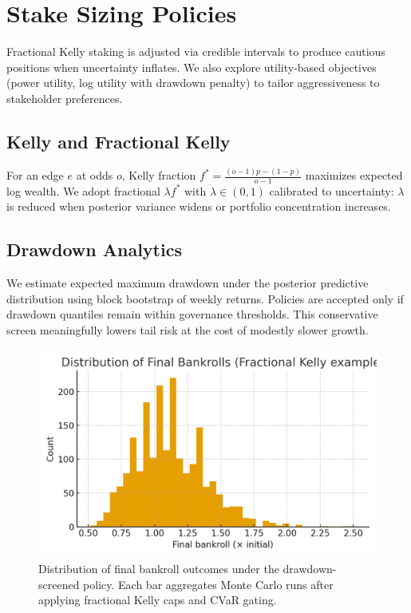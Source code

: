 \section{Stake Sizing Policies}
Fractional Kelly staking is adjusted via credible intervals to produce cautious positions when uncertainty inflates. We also explore utility-based objectives (power utility, log utility with drawdown penalty) to tailor aggressiveness to stakeholder preferences.

\subsection{Kelly and Fractional Kelly}
For an edge \(e\) at odds \(o\), Kelly fraction \(f^* = \frac{(o-1)p - (1-p)}{o-1}\) maximizes expected log wealth. We adopt fractional \(\lambda f^*\) with \(\lambda \in (0,1)\) calibrated to uncertainty: \(\lambda\) is reduced when posterior variance widens or portfolio concentration increases.

\subsection{Drawdown Analytics}
We estimate expected maximum drawdown under the posterior predictive distribution using block bootstrap of weekly returns. Policies are accepted only if drawdown quantiles remain within governance thresholds. This conservative screen meaningfully lowers tail risk at the cost of modestly slower growth.

\begin{figure}[t]
  \centering
  \includegraphics[width=0.9\linewidth]{../figures/bankroll_hist.png}
  \caption{Distribution of final bankroll outcomes under the drawdown-screened policy. Each bar aggregates Monte Carlo runs after applying fractional Kelly caps and CVaR gating.}
  \label{fig:bankroll-hist}
\end{figure}


